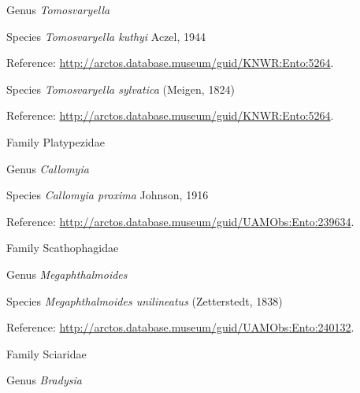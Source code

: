 \documentclass[9pt, article]{memoir}
\begin{document}
\begin{multicols}{2}
\vspace{6pt}\noindent\hspace{30pt}Genus \textit{Tomosvaryella}


\vspace{6pt}\noindent\hspace{36pt}Species \textit{Tomosvaryella kuthyi} Aczel, 1944


\vspace{6pt}Reference: 
\url{http://arctos.database.museum/guid/KNWR:Ento:5264}.

\vspace{6pt}\noindent\hspace{36pt}Species \textit{Tomosvaryella sylvatica} (Meigen, 1824)


\vspace{6pt}Reference: 
\url{http://arctos.database.museum/guid/KNWR:Ento:5264}.

\vspace{6pt}\noindent\hspace{24pt}Family Platypezidae


\vspace{6pt}\noindent\hspace{30pt}Genus \textit{Callomyia}


\vspace{6pt}\noindent\hspace{36pt}Species \textit{Callomyia proxima} Johnson, 1916


\vspace{6pt}Reference: 
\url{http://arctos.database.museum/guid/UAMObs:Ento:239634}.

\vspace{6pt}\noindent\hspace{24pt}Family Scathophagidae


\vspace{6pt}\noindent\hspace{30pt}Genus \textit{Megaphthalmoides}


\vspace{6pt}\noindent\hspace{36pt}Species \textit{Megaphthalmoides unilineatus} (Zetterstedt, 1838)


\vspace{6pt}Reference: 
\url{http://arctos.database.museum/guid/UAMObs:Ento:240132}.

\vspace{6pt}\noindent\hspace{24pt}Family Sciaridae


\vspace{6pt}\noindent\hspace{30pt}Genus \textit{Bradysia}



\end{multicols}
\end{document}

